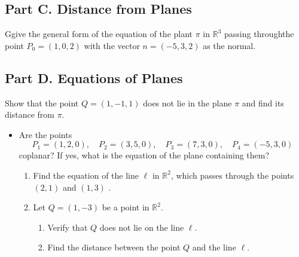\documentclass[12pt,a4paper]{article}
\begin{document}
\subsection*{Part C. Distance from Planes}	


Ggive the general form of the equation of the plant $\pi$ in $\mathbb{R}^3$ passing throughthe point $P_0 =(1,0,2)$ with the vector $n=(-5,3,2)$ as the normal.

\subsection*{Part D. Equations of Planes}	
Show that the point $Q=(1,-1,1)$ does not lie in the plane $\pi$ and find its distance from $\pi$.


\begin{itemize}
	\item Are the points 
	$$P_1=(1,2,0), \quad P_2=(3,5,0),\quad P_3=(7,3,0), \quad P_4=(-5,3,0)
	$$
	coplanar? If yes, what is the equation of the plane containing them?
	
	
	\begin{enumerate}
		\item Find the equation of the line $\ell$ in $\mathbb{R}^2$, which  passes through the 
		points $(2,1)$ and $(1,3)$ .
		
		\item  Let $Q = (1, -3)$  be a point in $\mathbb{R}^2$.
		\begin{enumerate}
			\item Verify that $Q$ does not lie on the line $\ell$.
			
			\item Find the distance between the point $Q$ and the line $\ell$.
		\end{enumerate}
	\end{enumerate}\newpage
	\vspace{0.25cm}
	
\end{itemize}
\end{document}
